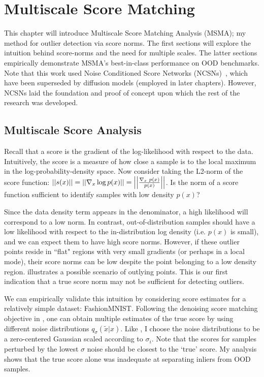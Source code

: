 \chapter{Multiscale Score Matching}
\label{ch:msma}

This chapter will introduce Multiscale Score Matching Analysis (MSMA); my method for outlier detection via score norms. The first sections will explore the intuition behind score-norms and the need for multiple scales. The latter sections empirically demonstrate MSMA's best-in-class performance on OOD benchmarks. Note that this work used Noise Conditioned Score Networks (NCSNs)~\cite{Song2019}, which have been superseded by diffusion models (employed in later chapters). However, NCSNs laid the foundation and proof of concept upon which the rest of the research was developed.

\section{Multiscale Score Analysis}
\label{sec:multiscale}
Recall that a score is the gradient of the log-likelihood with respect to the data. Intuitively, the score is a measure of how close a sample is to the local maximum in the log-probability-density space. Now consider taking the L2-norm of the score function:
$ \left|\left| { s(x) } \right|\right| = \left|\left| { \nabla_{x} \log p(x)  } \right|\right| = \left|\left| { \frac{\nabla_{x}\text{~}p(x)}{p(x)} } \right|\right| $. Is the norm of a score function sufficient to identify samples with low density $p(x)$?

Since the data density term appears in the denominator, a high likelihood will correspond to a low norm. In contrast, out-of-distribution samples should have a low likelihood with respect to the in-distribution log density (i.e. $p(x)$ is small), and we can expect them to have high score norms. However, if these outlier points reside in ``flat" regions with very small gradients (or perhaps in a local mode),  their score norms can be low despite the point belonging to a low density region. 
 illustrates a possible scenario of outlying points.
This is our first indication that a true score norm may not be sufficient for detecting outliers. 

We can empirically validate this intuition by considering score estimates for a relatively simple dataset: FashionMNIST. Following the denoising score matching objective in , one can obtain multiple estimates of the true score by using different noise distributions $q_{\sigma}(\tilde{x}|x)$. Like \cite{Song2019}, I choose the noise distributions to be a zero-centered Gaussian scaled according to $\sigma_i$. Note that the scores for samples perturbed by the lowest $\sigma$ noise should be closest to the `true' score. My analysis shows that the true score alone was inadequate at separating inliers from OOD samples.

